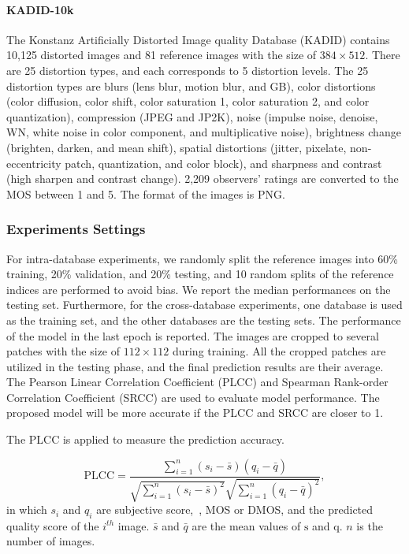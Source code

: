 \paragraph{KADID-10k} The Konstanz Artificially Distorted Image quality Database (KADID) contains 10,125 distorted images and 81 reference images with the size of $384 \times 512$. There are 25 distortion types, and each corresponds to 5 distortion levels. The 25 distortion types are blurs (lens blur, motion blur, and GB), color distortions (color diffusion, color shift, color saturation 1, color saturation 2, and color quantization), compression (JPEG and JP2K), noise (impulse noise, denoise, WN, white noise in color component, and multiplicative noise), brightness change (brighten, darken, and mean shift), spatial distortions (jitter, pixelate, non-eccentricity patch, quantization, and color block), and sharpness and contrast (high sharpen and contrast change). 2,209 observers' ratings are converted to the MOS between 1 and 5. The format of the images is PNG.

\subsubsection{Experiments Settings}\label{Experiments Settings}
For intra-database experiments, we randomly split the reference images into 60\% training, 20\% validation, and 20\% testing, and 10 random splits of the reference indices are performed to avoid bias. We report the median performances on the testing set. Furthermore, for the cross-database experiments, one database is used as the training set, and the other databases are the testing sets. The performance of the model in the last epoch is reported. The images are cropped to several patches with the size of $112 \times 112$ during training. All the cropped patches are utilized in the testing phase, and the final prediction results are their average. The Pearson Linear Correlation Coefficient (PLCC) and Spearman Rank-order Correlation Coefficient (SRCC) are used to evaluate model performance. The proposed model will be more accurate if the PLCC and SRCC are closer to 1.

The PLCC is applied to measure the prediction accuracy.

\begin{equation}
	\mathrm{PLCC}=\frac{\sum\limits_{i=1}^{n}\left(s_{i}-\bar{s}\right)\left(q_{i}-\bar{q}\right)}{\sqrt{\sum\limits_{i=1}^{n}\left(s_{i}-\bar{s}\right)^{2}} \sqrt{\sum\limits_{i=1}^{n}\left(q_{i}-\bar{q}\right)^{2}}},
\end{equation}
in which $s_{i}$ and $q_{i}$ are subjective score,~\ie, MOS or DMOS, and the predicted quality score of the $i^{th}$ image. $\bar{s}$ and $\bar{q}$ are the mean values of $\boldsymbol{\mathrm{s}}$ and $\boldsymbol{\mathrm{q}}$. $n$ is the number of images.

